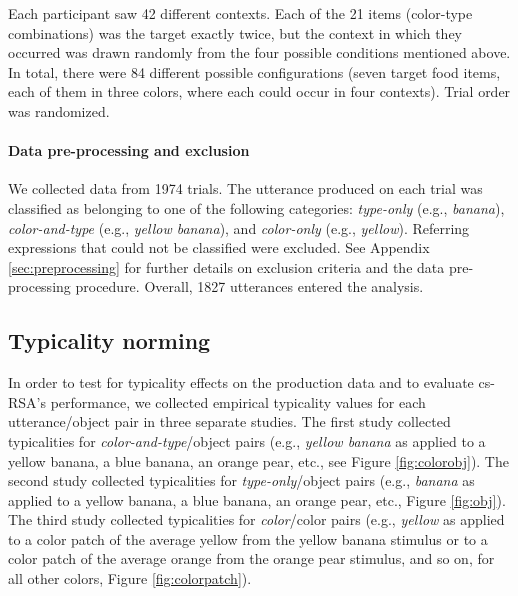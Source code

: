 \documentclass[11pt]{article}
\newcommand{\figref}[1]{Figure \ref{#1}}
\newcommand{\appref}[1]{Appendix \ref{#1}}
\begin{document}
Each participant saw 42 different contexts. Each of the 21 items (color-type combinations) was the target exactly twice, but the context in which they occurred was drawn randomly from the four possible conditions mentioned above. In total, there were 84 different possible configurations (seven target food items, each of them in three colors, where each could occur in four contexts). Trial order was randomized.


\paragraph{Data pre-processing and exclusion}

We collected data from 1974 trials. The utterance produced on each trial was classified as belonging to one of the following categories: \textit{type-only} (e.g., \emph{banana}), \textit{color-and-type} (e.g., \emph{yellow banana}), and \textit{color-only} (e.g., \emph{yellow}). Referring expressions that could not be classified were excluded. See \appref{sec:preprocessing} for further details on exclusion criteria and the data pre-processing procedure. Overall, 1827 utterances entered the analysis.


\subsection{Typicality norming}
\label{sec:typicalitynormingcolor}

In order to test for typicality effects on the production data and to evaluate cs-RSA's performance, we collected empirical typicality values for each utterance/object pair in three separate studies. The first study collected typicalities for \emph{color-and-type}/object pairs (e.g., \emph{yellow banana} as applied to a yellow banana, a blue banana, an orange pear, etc., see \figref{fig:colorobj}). The second study collected typicalities for \emph{type-only}/object pairs (e.g., \emph{banana} as applied to a yellow banana, a blue banana, an orange pear, etc., \figref{fig:obj}). The third study collected typicalities for \emph{color}/color pairs (e.g., \emph{yellow} as applied to a color patch of the average yellow from the yellow banana stimulus or to a color patch of the average orange from the orange pear stimulus, and so on, for all other colors, \figref{fig:colorpatch}). 
\end{document}

